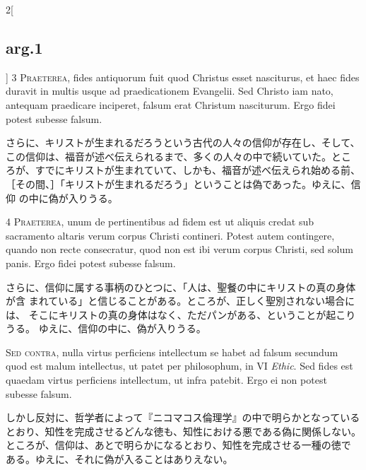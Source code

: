\documentclass[paper=a4paper,fontsize=10pt,jafontsize=9pt,titlepage]{jlreq}
\begin{document}
\begin{paracol}{2}[\subsection{arg.1}]
{\scshape 3 Praeterea}, fides antiquorum fuit quod
Christus esset nasciturus, et haec fides duravit in multis usque ad
praedicationem Evangelii. Sed Christo iam nato, antequam praedicare
inciperet, falsum erat Christum nasciturum. Ergo fidei potest subesse
falsum.

\switchcolumn

さらに、キリストが生まれるだろうという古代の人々の信仰が存在し、そして、
 この信仰は、福音が述べ伝えられるまで、多くの人々の中で続いていた。とこ
 ろが、すでにキリストが生まれていて、しかも、福音が述べ伝えられ始める前、
［その間、］「キリストが生まれるだろう」ということは偽であった。ゆえに、信仰
 の中に偽が入りうる。


{\scshape 4 Praeterea}, unum de pertinentibus ad
fidem est ut aliquis credat sub sacramento altaris verum corpus Christi
contineri. Potest autem contingere, quando non recte consecratur, quod
non est ibi verum corpus Christi, sed solum panis. Ergo fidei potest
subesse falsum.

\switchcolumn

さらに、信仰に属する事柄のひとつに、「人は、聖餐の中にキリストの真の身体が含
 まれている」と信じることがある。ところが、正しく聖別されない場合には、
 そこにキリストの真の身体はなく、ただパンがある、ということが起こりうる。
 ゆえに、信仰の中に、偽が入りうる。

\switchcolumn*[\subsection{s.c.}]

{\scshape  Sed contra}, nulla virtus perficiens
intellectum se habet ad falsum secundum quod est malum intellectus, ut
patet per philosophum, in VI {\itshape Ethic}. Sed fides est quaedam virtus
perficiens intellectum, ut infra patebit. Ergo ei non potest subesse
falsum.

\switchcolumn

しかし反対に、哲学者によって『ニコマコス倫理学』の中で明らかとなっている
 とおり、知性を完成させるどんな徳も、知性における悪である偽に関係しない。
 ところが、信仰は、あとで明らかになるとおり、知性を完成させる一種の徳で
 ある。ゆえに、それに偽が入ることはありえない。



\end{paracol}
\end{document}
